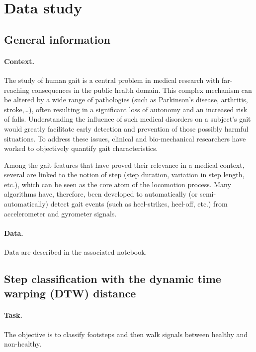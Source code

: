 \documentclass[11pt]{article}
\begin{document}
\section{Data study}

\subsection{General information}

\paragraph{Context.}
The study of human gait is a central problem in medical research with far-reaching consequences in the public health domain. This complex mechanism can be altered by a wide range of pathologies (such as Parkinson's disease, arthritis, stroke,\ldots), often resulting in a significant loss of autonomy and an increased risk of falls. Understanding the influence of such medical disorders on a subject's gait would greatly facilitate early detection and prevention of those possibly harmful situations. To address these issues, clinical and bio-mechanical researchers have worked to objectively quantify gait characteristics.

Among the gait features that have proved their relevance in a medical context, several are linked to the notion of step (step duration, variation in step length, etc.), which can be seen as the core atom of the locomotion process. Many algorithms have, therefore, been developed to automatically (or semi-automatically) detect gait events (such as heel-strikes, heel-off, etc.) from accelerometer and gyrometer signals.

\paragraph{Data.}
Data are described in the associated notebook.

\subsection{Step classification with the dynamic time warping (DTW) distance}

\paragraph{Task.} The objective is to classify footsteps and then walk signals between healthy and non-healthy.
\end{document}
